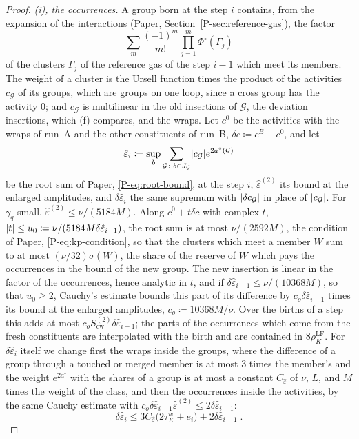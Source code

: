 \documentclass[11pt]{preprint}
\DeclarePairedDelimiter{\abs}{\lvert}{\rvert}
\numberwithin{equation}{section}
\theoremstyle{definition}
\theoremstyle{remark}
\theoremstyle{plain}
\begin{document}
\begin{proof}
\emph{(i), the occurrences.} A group born at the step $i$ contains, from the expansion of the interactions (Paper, Section~\ref{P-sec:reference-gas}), the factor
\[
    \sum_m\frac{(-1)^m}{m!}\prod_{j=1}^{m}\Phi^\circ(\Gamma_j)
\]
of the clusters $\Gamma_j$ of the reference gas of the step $i - 1$ which meet its members. The weight of a cluster is the Ursell function times the product of the activities $c_{\mathcal G}$ of its groups, which are groups on one loop, since a cross group has the activity $0$; and $c_{\mathcal G}$ is multilinear in the old insertions of $\mathcal G$, the deviation insertions, which (f) compares, and the wraps. Let $c^0$ be the activities with the wraps of run~A and the other constituents of run~B, $\delta c \coloneqq c^B - c^0$, and let
\[
    \hat\varepsilon_i \coloneqq \sup_b\sum_{\mathcal G \colon b \in J_{\mathcal G}}\abs{c_{\mathcal G}}e^{2a^\circ(\mathcal G)}
\]
be the root sum of Paper, \eqref{P-eq:root-bound}, at the step $i$, $\hat\varepsilon^{(2)}$ its bound at the enlarged amplitudes, and $\delta\hat\varepsilon_i$ the same supremum with $\abs{\delta c_{\mathcal G}}$ in place of $\abs{c_{\mathcal G}}$. For $\gamma_q$ small, $\hat\varepsilon^{(2)} \leq \nu/(5184M)$. Along $c^0 + t\delta c$ with complex $t$, $\abs t \leq u_0 \coloneqq \nu/(5184M\delta\hat\varepsilon_{i-1})$, the root sum is at most $\nu/(2592M)$, the condition of Paper, \eqref{P-eq:kp-condition}, so that the clusters which meet a member $W$ sum to at most $(\nu/32)\sigma(W)$, the share of the reserve of $W$ which pays the occurrences in the bound of the new group. The new insertion is linear in the factor of the occurrences, hence analytic in $t$, and if $\delta\hat\varepsilon_{i-1} \leq \nu/(10368M)$, so that $u_0 \geq 2$, Cauchy's estimate bounds this part of its difference by $c_o\delta\hat\varepsilon_{i-1}$ times its bound at the enlarged amplitudes, $c_o \coloneqq 10368M/\nu$. Over the births of a step this adds at most $c_oS^{(2)}_{\mathrm{cw}}\delta\hat\varepsilon_{i-1}$; the parts of the occurrences which come from the fresh constituents are interpolated with the birth and are contained in $8\rho^{\mathrm{LF}}_K$. For $\delta\hat\varepsilon_i$ itself we change first the wraps inside the groups, where the difference of a group through a touched or merged member is at most $3$ times the member's and the weight $e^{2a^\circ}$ with the shares of a group is at most a constant $C_{\hat\varepsilon}$ of $\nu$, $L$, and $M$ times the weight of the class, and then the occurrences inside the activities, by the same Cauchy estimate with $c_o\delta\hat\varepsilon_{i-1}\hat\varepsilon^{(2)} \leq 2\delta\hat\varepsilon_{i-1}$:
\begin{equation}\label{eq:activity-difference}
    \delta\hat\varepsilon_i \leq 3C_{\hat\varepsilon}\bigl(2\tau^w_K + e_i\bigr) + 2\delta\hat\varepsilon_{i-1}\;.
\end{equation}


\end{proof}
\end{document}
